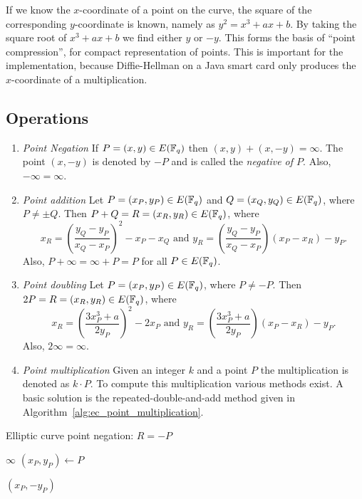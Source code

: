 If we know the $x$-coordinate of a point on the curve, the square of the
corresponding $y$-coordinate is known, namely as $y^{2} = x^{3} + ax + b$.
By taking the square root of $x^{3} + ax + b$ we find either $y$ or $-y$.
This forms the basis of ``point compression'', for compact representation
of points.  This is important for the implementation, because Diffie-Hellman
on a Java smart card only produces the $x$-coordinate of a multiplication.

\subsection{Operations}

\begin{enumerate}
  \item \emph{Point Negation}
    If $P = (x, y) \in E(\mathbb{F}_{q})$ then $(x, y) + (x, -y) = \infty$. The point
    $(x, -y)$ is denoted by $-P$ and is called the \emph{negative of $P$}.
    Also, $-\infty = \infty$.
  \item \emph{Point addition}
    Let $P = (x_P, y_P) \in E(\mathbb{F}_{q})$ and $Q = (x_Q, y_Q) \in E(\mathbb{F}_{q})$, where
    $P \neq \pm Q$. Then $P + Q = R = (x_R, y_R) \in E(\mathbb{F}_{q})$, where
    \begin{equation*}
      x_R = \left(\dfrac{y_Q - y_P}{x_Q - x_P}\right)^2 - x_P - x_Q
      \text{ and }
      y_R = \left(\dfrac{y_Q - y_P}{x_Q - x_P}\right) (x_P - x_R) - y_P
      \text{.}
    \end{equation*}
    Also, $P + \infty = \infty + P = P$ for all $P \in E(\mathbb{F}_{q})$.
  \item \emph{Point doubling}
    Let $P = (x_P, y_P) \in E(\mathbb{F}_{q})$, where $P \neq -P$. Then
    $2P = R = (x_R, y_R) \in E(\mathbb{F}_{q})$, where
    \begin{equation*}
      x_R = \left(\dfrac{3 x_P^3 + a}{2 y_P}\right)^2 - 2 x_P
      \text{ and }
      y_R = \left(\dfrac{3 x_P^3 + a}{2 y_P}\right) (x_P - x_R) - y_P
      \text{.}
    \end{equation*}
    Also, $2\infty = \infty$.
  \item \emph{Point multiplication}
    Given an integer $k$ and a point $P$ the multiplication is denoted as
    $k \cdot P$. To compute this multiplication various methods exist. A basic
    solution is the repeated-double-and-add method given in Algorithm~\ref{alg:ec_point_multiplication}.
\end{enumerate}

\begin{algorithm}
  \caption{Elliptic curve point negation: $R = -P$}
  \label{alg:ec_point_negation}

  \begin{algorithmic}[1]
        \Return $\infty$
      \Else
        \State $(x_P, y_P) \gets P$
      \EndIf

      \smallskip
      \Return $(x_P, -y_P)$
    \EndFunction
  \end{algorithmic}
\end{algorithm}


